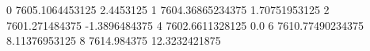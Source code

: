 0 7605.1064453125 2.4453125
1 7604.36865234375 1.70751953125
2 7601.271484375 -1.3896484375
4 7602.6611328125 0.0
6 7610.77490234375 8.11376953125
8 7614.984375 12.3232421875
